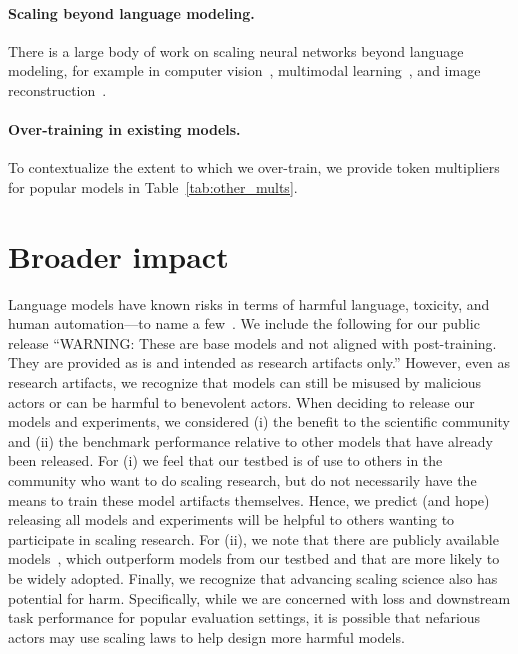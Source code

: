 \begin{appendix}
\paragraph{Scaling beyond language modeling.}
There is a large body of work on scaling neural networks beyond language modeling, for example in computer vision~\cite{liu2022convnet,zhai2022scaling,sorscher2022beyond,abnar2022exploring,alabdulmohsin2022revisiting}, multimodal learning~\cite{Henighan2020ScalingLF,cherti2023reproducible,datacomp}, and image reconstruction~\cite{klug2023analyzing}. 

\paragraph{Over-training in existing models.}

To contextualize the extent to which we over-train, we provide token multipliers for popular models in Table~\ref{tab:other_mults}.

\section{Broader impact}
\label{appx:broader}

Language models have known risks in terms of harmful language, toxicity, and human automation---to name a few~\cite{weidinger2021ethical,bender2021dangers}.
We include the following for our public release ``WARNING: These are base models and not aligned with post-training. They are provided as is and intended as research artifacts only.''
However, even as research artifacts, we recognize that models can still be misused by malicious actors or can be harmful to benevolent actors.
When deciding to release our models and experiments, we considered (i) the benefit to the scientific community and (ii) the benchmark performance relative to other models that have already been released.
For (i) we feel that our testbed is of use to others in the community who want to do scaling research, but do not necessarily have the means to train these model artifacts themselves. Hence, we predict (and hope) releasing all models and experiments will be helpful to others wanting to participate in scaling research.
For (ii), we note that there are publicly available models~\cite{llama,llama2,jiang2023mistral}, which outperform models from our testbed and that are more likely to be widely adopted.
Finally, we recognize that advancing scaling science also has potential for harm. Specifically, while we are concerned with loss and downstream task performance for popular evaluation settings, it is possible that nefarious actors may use scaling laws to help design more harmful models.

\end{appendix}